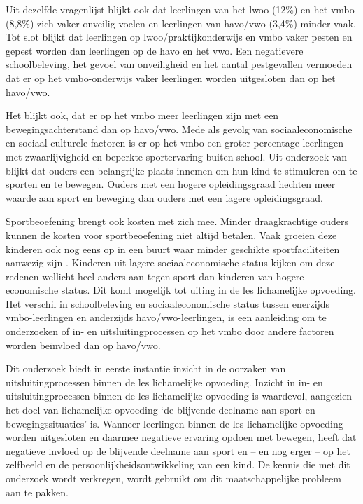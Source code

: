 \documentclass[a4paper,12pt]{memoir}
\begin{document}
Uit dezelfde vragenlijst blijkt ook dat leerlingen van het lwoo (12\%) en het vmbo (8,8\%) zich vaker onveilig voelen en leerlingen van havo/vwo (3,4\%) minder vaak. Tot slot blijkt dat leerlingen op lwoo/praktijkonderwijs en vmbo vaker pesten en gepest worden dan leerlingen op de havo en het vwo. Een negatievere schoolbeleving, het gevoel van onveiligheid en het aantal pestgevallen vermoeden dat er op het vmbo-onderwijs vaker leerlingen worden uitgesloten dan op het havo/vwo.

Het blijkt ook, dat er op het vmbo meer leerlingen zijn met een bewegingsachterstand dan op havo/vwo. Mede als gevolg van sociaaleconomische en sociaal-culturele factoren is er op het vmbo een groter percentage leerlingen met zwaarlijvigheid en beperkte sportervaring buiten school. Uit onderzoek van \textcite{frelier} blijkt dat ouders een belangrijke plaats innemen om hun kind te stimuleren om te sporten en te bewegen. Ouders met een hogere opleidingsgraad hechten meer waarde aan sport en beweging dan ouders met een lagere opleidingsgraad.
 
Sportbeoefening brengt ook kosten met zich mee. Minder draagkrachtige ouders kunnen de kosten voor sportbeoefening niet altijd betalen. Vaak groeien deze kinderen ook nog eens op in een buurt waar minder geschikte sportfaciliteiten aanwezig zijn \parencite{humbert}. Kinderen uit lagere sociaaleconomische status kijken om deze redenen wellicht heel anders aan tegen sport dan kinderen van hogere economische status. Dit komt mogelijk tot uiting in de les lichamelijke opvoeding. Het verschil in schoolbeleving en sociaaleconomische status tussen enerzijds vmbo-leerlingen en anderzijds havo/vwo-leerlingen, is een aanleiding om te onderzoeken of in- en uitsluitingprocessen op het vmbo door andere factoren worden beïnvloed dan op havo/vwo.

Dit onderzoek biedt in eerste instantie inzicht in de oorzaken van uitsluitingprocessen binnen de les lichamelijke opvoeding. Inzicht in in- en uitsluitingprocessen binnen de les lichamelijke opvoeding is waardevol, aangezien het doel van lichamelijke opvoeding `de blijvende deelname aan sport en bewegingssituaties' \parencite[29]{stegeman} is. Wanneer leerlingen binnen de les lichamelijke opvoeding worden uitgesloten en daarmee negatieve ervaring opdoen met bewegen, heeft dat negatieve invloed op de blijvende deelname aan sport en – en nog erger – op het zelfbeeld en de persoonlijkheidsontwikkeling van een kind. De kennis die met dit onderzoek wordt verkregen, wordt gebruikt om dit maatschappelijke probleem aan te pakken.
\end{document}
